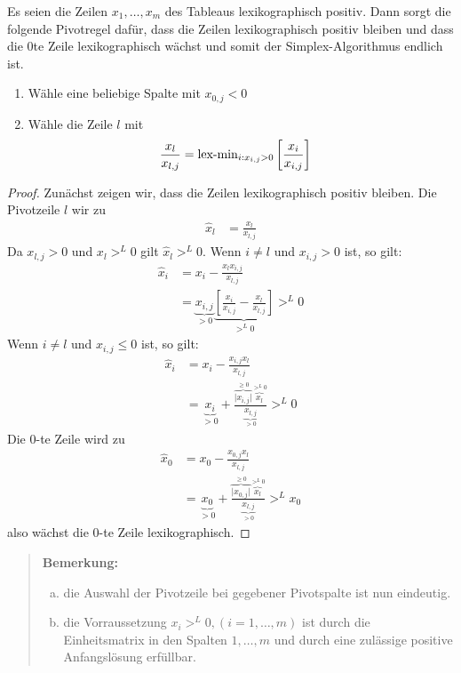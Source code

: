 \begin{theorem}
Es seien die Zeilen $x_1, \dotsc, x_m$ des Tableaus lexikographisch positiv. Dann sorgt die folgende Pivotregel dafür, dass die Zeilen lexikographisch positiv bleiben und dass die $0$te Zeile lexikographisch wächst und somit der Simplex-Algorithmus endlich ist.
\begin{enumerate}
\item Wähle eine beliebige Spalte mit $x_{0,j} < 0$
\item Wähle die Zeile $l$ mit
\begin{align*}
\frac{x_l}{x_{l,j}} &= \operatorname{lex-min}_{i:x_{i,j} > 0} \left \lbrack \frac{x_i}{x_{i,j}} \right \rbrack
\end{align*}
\end{enumerate}
\end{theorem}
\begin{proof}
Zunächst zeigen wir, dass die Zeilen lexikographisch positiv bleiben.
Die Pivotzeile $l$ wir zu
\begin{align*}
\hat{x}_l &= \frac{x_l}{x_{l,j}}
\end{align*}
Da $x_{l,j} > 0$ und $x_l >^L 0$ gilt $\hat{x}_l >^L 0$. Wenn $i \neq l$ und $x_{i,j} > 0$ ist, so gilt:
\begin{align*}
\hat{x}_i &= x_i - \frac{x_lx_{i,j}}{x_{l,j}} \\
&= \underbrace{x_{i,j}}_{>0} \underbrace{ \left \lbrack \frac{x_i}{x_{i,j}} - \frac{x_l}{x_{l,j}} \right \rbrack }_{>^L 0} >^L 0
\end{align*}
Wenn $i \neq l$ und $x_{i,j} \leq 0$ ist, so gilt:
\begin{align*}
\hat{x}_i &= x_i - \frac{x_{i,j} x_l}{x_{l,j}} \\
&= \underbrace{x_i}_{>0} + \frac{\overbrace{\lvert x_{i,j} \rvert}^{\geq 0} \overbrace{x_l}^{>^L 0}}{\underbrace{x_{l,j}}_{>0}} >^L 0
\end{align*}
Die $0$-te Zeile wird zu
\begin{align*}
\hat{x}_0 &= x_0 - \frac{x_{0,j} x_l}{x_{l,j}} \\
&= \underbrace{x_0}_{>0} + \frac{\overbrace{\lvert x_{0,j} \rvert}^{\geq 0} \overbrace{x_l}^{>^L 0}}{\underbrace{x_{l,j}}_{>0}} >^L x_0
\end{align*}
also wächst die $0$-te Zeile lexikographisch.
\end{proof}
\begin{quote}
\textbf{Bemerkung: }
\begin{enumerate}[a)]
\item die Auswahl der Pivotzeile bei gegebener Pivotspalte ist nun eindeutig.
\item die Vorraussetzung $x_i >^L 0, (i = 1,\dotsc,m)$ ist durch die Einheitsmatrix in den Spalten $1,\dotsc,m$ und durch eine zulässige positive Anfangslösung erfüllbar.
\end{enumerate}
\end{quote}

